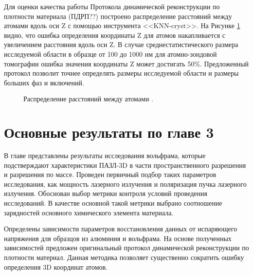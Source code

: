 Для оценки качества работы Протокола динамической реконструкции по плотности материала (ПДРП??) построено распределение расстояний между атомами вдоль оси Z с помощью инструмента <<KNN-cryst>>. На Рисунке \cref{fig:p3_atomiccount_distance} видно, что ошибка определения координаты Z для атомов накапливается с увеличением расстояния вдоль оси Z. В случае среднестатистического размера исследуемой области в 
образце от 100 до 1000 нм для атомно-зондовой томографии ошибка значения координаты Z может достигать 50\%. Предложенный протокол позволит точнее определять размеры исследуемой области и размеры больших фаз и включений.

\begin{figure}[htb]
	\caption{Распределение расстояний между атомами \cite{scbibDensity}.}
	\label{fig:p3_atomiccount_distance}
\end{figure}




\FloatBarrier
\clearpage
\section{Основные результаты по главе 3}\label{sec:ch3/sect6}

В главе представлены результаты исследования вольфрама, которые подстверждают характеристики ПАЗЛ-3D в части пространственного разрешения и разрешения по массе. Проведен первичный подбор таких параметров исследования, как мощность лазерного излучения и поляризация пучка лазерного излучения. Обоснован выбор метрики контроля условий проведения исследований. В качестве основной такой метрики выбрано соотношение зарядностей основного химического элемента материала.

Определены зависимости параметров восстановления данных от испаряющего напряжения для образцов из алюминия и вольфрама. На основе полученных зависимостей предложен оригинальный протокол динамической реконструкции по плотности материал. Данная методика позволяет существенно сократить ошибку определения 3D координат атомов.










\clearpage
